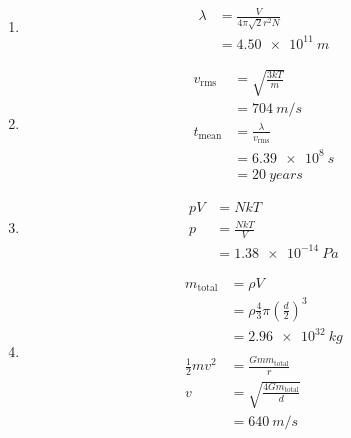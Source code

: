 \documentclass{article}
\begin{document}
\setcounter{subsubsection}{82}
\subsubsection{}

\begin{enumerate}
  \item

        \begin{align*}
          \lambda & = \frac{V}{4 \pi \sqrt{2} r^2 N} \\
                  & = \qty{4.50e11}{m}
        \end{align*}

  \item

        \begin{align*}
          v_\text{rms}  & = \sqrt{\frac{3 k T}{m}}       \\
                        & = \qty{704}{m/s}               \\
          t_\text{mean} & = \frac{\lambda}{v_\text{rms}} \\
                        & = \qty{6.39e8}{s}              \\
                        & = \qty{20}{years}
        \end{align*}

  \item

        \begin{align*}
          p V & = N k T              \\
          p   & = \frac{N k T}{V}    \\
              & = \qty{1.38e-14}{Pa}
        \end{align*}

  \item

        \begin{align*}
          m_\text{total}    & = \rho V                                            \\
                            & = \rho \frac{4}{3} \pi \left( \frac{d}{2} \right)^3 \\
                            & = \qty{2.96e32}{kg}                                 \\ \\
          \frac{1}{2} m v^2 & = \frac{G m m_\text{total}}{r}                      \\
          v                 & = \sqrt{\frac{4 G m_\text{total}}{d}}               \\
                            & = \qty{640}{m/s}
        \end{align*}


\end{enumerate}
\end{document}
